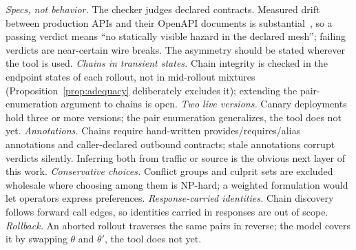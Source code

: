 \emph{Specs, not behavior.} The checker judges declared contracts.
Measured drift between production APIs and their OpenAPI documents is
substantial~\cite{apicontextdrift}, so a passing verdict means ``no
statically visible hazard in the declared mesh''; failing verdicts are
near-certain wire breaks. The asymmetry should be stated wherever the
tool is used. \emph{Chains in transient states.} Chain integrity is
checked in the endpoint states of each rollout, not in mid-rollout
mixtures (Proposition~\ref{prop:adequacy} deliberately excludes it);
extending the pair-enumeration argument to chains is open.
\emph{Two live versions.} Canary deployments hold three or more
versions; the pair enumeration generalizes, the tool does not yet.
\emph{Annotations.} Chains require hand-written
provides/requires/alias annotations and caller-declared outbound
contracts; stale annotations corrupt verdicts silently. Inferring both
from traffic or source is the obvious next layer of this work.
\emph{Conservative choices.} Conflict groups and culprit sets are
excluded wholesale where choosing among them is NP-hard; a weighted
formulation would let operators express preferences.
\emph{Response-carried identities.} Chain discovery follows forward
call edges, so identities carried in responses are out of scope.
\emph{Rollback.} An aborted rollout traverses the same pairs in
reverse; the model covers it by swapping $\theta$ and $\theta'$, the
tool does not yet.







